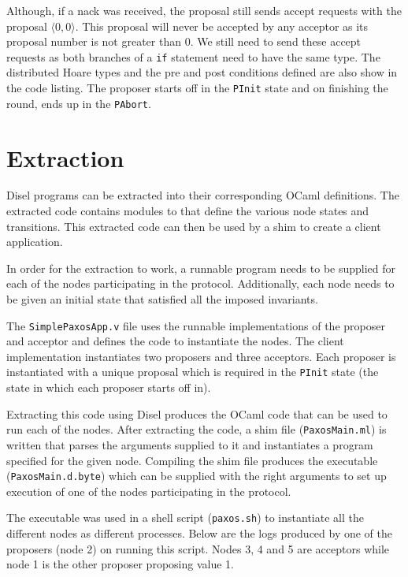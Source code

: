 Although, if a nack was received, the proposal still sends
accept requests with the proposal $\langle 0, 0 \rangle$. This proposal will
never be accepted by any acceptor as its proposal number is not greater than 0.
We still need to send these accept requests as both branches of a \texttt{if}
statement need to have the same type. The distributed Hoare types and the pre and post conditions
defined are also show in the code listing. The proposer starts off in the \texttt{PInit}
state and on finishing the round, ends up in the \texttt{PAbort}.


\section{Extraction}
Disel programs can be extracted into their corresponding OCaml definitions.
The extracted code contains modules to that define the various node states
and transitions. This extracted code can then be used by a shim to create a
client application.

In order for the extraction to work, a runnable program needs to be supplied for each of
the nodes participating in the protocol. Additionally, each node needs to
be given an initial state that satisfied all the imposed invariants.

The \texttt{SimplePaxosApp.v} file uses the runnable implementations of
the proposer and acceptor and defines the code to instantiate the nodes.
The client implementation instantiates two proposers and three acceptors.
Each proposer is instantiated with a unique proposal which is required in the
\texttt{PInit} state (the state in which each proposer starts off in).

Extracting this code using Disel produces the OCaml code
that can be used to run each of the nodes. After extracting the code,
a shim file (\texttt{PaxosMain.ml}) is written that parses the arguments
supplied to it and instantiates a program specified
for the given node. Compiling the shim file produces the executable (\texttt{PaxosMain.d.byte})
which can be supplied with the right arguments to set up execution of one
of the nodes participating in the protocol.

The executable was used in a shell script (\texttt{paxos.sh})
to instantiate all the different nodes as different processes.
Below are the logs produced by one of the
proposers (node 2) on running this script. Nodes 3, 4 and 5 are acceptors while
node 1 is the other proposer proposing value 1.

